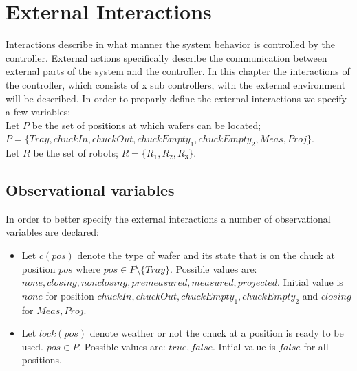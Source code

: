 \section{External Interactions}
Interactions describe in what manner the system behavior is controlled by the controller.
External actions specifically describe the communication between external parts of the system and the controller.
In this chapter the interactions of the controller, which consists of x sub controllers, with the external environment will be described. In order to proparly define the external interactions we specify a few variables:
\\Let $P$ be the set of positions at which wafers can be located; $P = \{Tray, chuckIn, chuckOut, chuckEmpty_1, chuckEmpty_2, Meas, Proj\}$.
\\Let $R$ be the set of robots; $R = \{R_1,R_2,R_3\}$.

\subsection{Observational variables}
In order to better specify the external interactions a number of observational variables are declared:
\begin{itemize}
\item Let $c(pos)$ denote the type of wafer and its state that is on the chuck at position $pos$ where $pos \in P \setminus \{Tray\}$. Possible values are: $none, closing, nonclosing, premeasured, measured, projected$. Initial value is $none$ for position $chuckIn, chuckOut, chuckEmpty_1, chuckEmpty_2$ and $closing$ for $Meas, Proj$.
\item Let $lock(pos)$ denote weather or not the chuck at a position is ready to be used. $pos \in P$. Possible values are: $true, false$. Intial value is $false$ for all positions.
\end{itemize}
